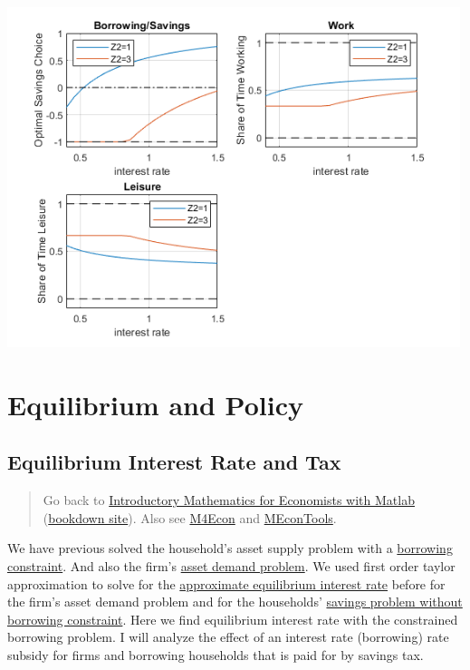 \documentclass[
]{book}
\begin{document}
\includegraphics[width=5.20833in,height=\textheight]{img/household_asset_labor_constrained_images/figure_1.png}

\hypertarget{equilibrium-and-policy}{%
\chapter{Equilibrium and Policy}\label{equilibrium-and-policy}}

\hypertarget{equilibrium-interest-rate-and-tax}{%
\section{Equilibrium Interest Rate and Tax}\label{equilibrium-interest-rate-and-tax}}

\begin{quote}
Go back to \href{https://math4econ.github.io/}{Introductory Mathematics for Economists with Matlab} (\href{https://math4econ.github.io/bookdown}{bookdown site}). Also see \href{http://fanwangecon.github.io/M4Econ}{M4Econ} and \href{https://fanwangecon.github.io/MEconTools/}{MEconTools}.
\end{quote}

We have previous solved the household's asset supply problem with a
\href{https://math4econ.github.io/optimization_application/household_borrow_constrained.html}{borrowing
constraint}.
And also the firm's \href{https://math4econ.github.io/derivative_application/K_borrow_firm.html}{asset demand
problem}.
We used first order taylor approximation to solve for the \href{https://math4econ.github.io/matrix_application/demand_supply_taylor_approximate_capital.html}{approximate
equilibrium interest
rate}
before for the firm's asset demand problem and for the households'
\href{https://math4econ.github.io/derivative_application/K_save_households.html}{savings problem without borrowing
constraint}.
Here we find equilibrium interest rate with the constrained borrowing
problem. I will analyze the effect of an interest rate (borrowing) rate
subsidy for firms and borrowing households that is paid for by savings
tax.
\end{document}
